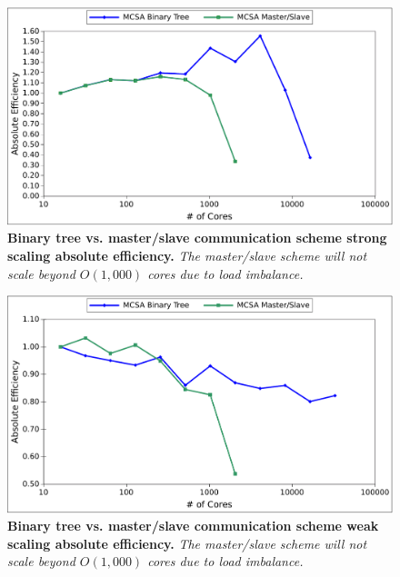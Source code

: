\begin{figure}[t!]
  \begin{center}
    \includegraphics[width=6in]{chapters/parallel_mc/titan_strong_bvsm.pdf}
  \end{center}
  \caption{\textbf{Binary tree vs. master/slave communication scheme
      strong scaling absolute efficiency.} \textit{The master/slave
      scheme will not scale beyond $O(1,000)$ cores due to load
      imbalance.}}
  \label{fig:titan_strong_bvsm}
\end{figure}

\begin{figure}[t!]
  \begin{center}
    \includegraphics[width=6in]{chapters/parallel_mc/titan_weak_bvsm.pdf}
  \end{center}
  \caption{\textbf{Binary tree vs. master/slave communication scheme
      weak scaling absolute efficiency.}  \textit{The master/slave
      scheme will not scale beyond $O(1,000)$ cores due to load
      imbalance.}}
  \label{fig:titan_weak_bvsm}
\end{figure}

